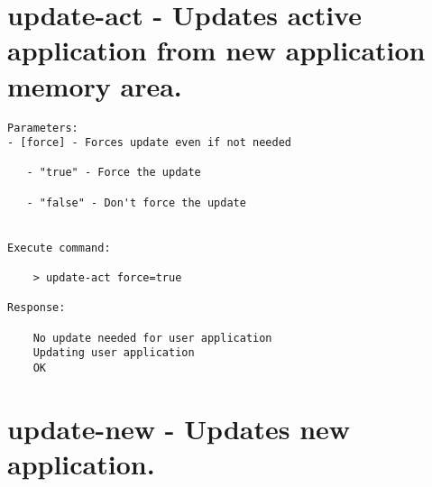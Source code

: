\section{update-act - Updates active application from new application memory area.}
\label{bl_cmd:update-act}

\begin{lstlisting}
Parameters:
- [force] - Forces update even if not needed

   - "true" - Force the update
                
   - "false" - Don't force the update


Execute command: 

    > update-act force=true
    
Response: 

    No update needed for user application
    Updating user application
    OK
\end{lstlisting}
    

\section{update-new - Updates new application.}
\label{bl_cmd:update-new}

